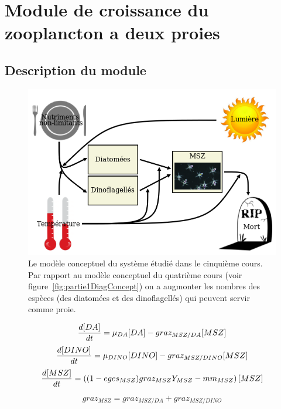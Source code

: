 \section{Module de croissance du zooplancton a deux proies}

\subsection{Description du module}

\begin{figure}
  \includegraphics[width=\textwidth]{partie2/diagConc.png}
  \caption{Le modèle conceptuel du système étudié dans le cinquième cours. Par rapport
au modèle conceptuel du quatrième cours (voir figure~\ref{fig:partie1DiagConcept}) on
a augmonter les nombres des espèces (des diatomées et des dinoflagellés) qui peuvent
servir comme proie.
}
  \label{fig:partie2DiagConc}
\end{figure}

\begin{equation}
  {{d[DA]}\over{dt}} =
  \mu_{DA} [DA] - graz_{MSZ/DA} [MSZ]
  \label{eq:partie2DiffEq1}
\end{equation}
\begin{equation}
  {{d[DINO]}\over{dt}} =
  \mu_{DINO} [DINO] - graz_{MSZ/DINO} [MSZ]
  \label{eq:partie2DiffEq2}
\end{equation}
\begin{equation}
  {{d[MSZ]}\over{dt}} =
  \left (
    (1- eges_{MSZ}) graz_{MSZ} Y_{MSZ} - mm_{MSZ}
  \right ) [MSZ]
  \label{eq:partie2DiffEq3}
\end{equation}


\begin{equation}
  graz_{MSZ} = graz_{MSZ/DA} + graz_{MSZ/DINO}
  \label{eq:partie2grazMsz}
\end{equation}

